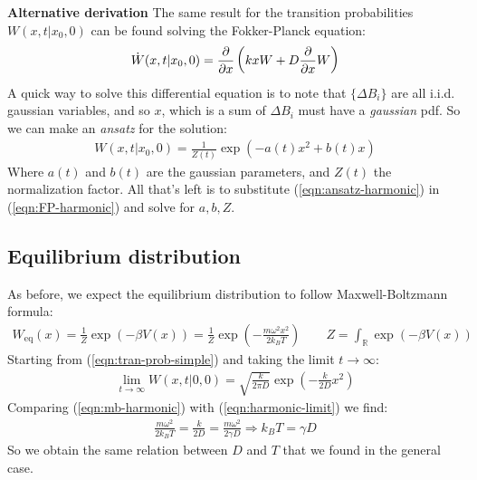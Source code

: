 \documentclass[../template.tex]{subfiles}
\begin{document}
\begin{expl}\textbf{Alternative derivation} 
    The same result for the transition probabilities $W(x,t|x_0,0)$ can be found solving the Fokker-Planck equation:
    \begin{align}
        \dot{W}(x,t|x_0,0) = \pdv{x} \left(kx W + D \pdv{x}W\right)
        \label{eqn:FP-harmonic}
    \end{align}
    A quick way to solve this differential equation is to note that $\{\Delta B_i\}$ are all i.i.d. gaussian variables, and so $x$, which is a sum of $\Delta B_i$ must have a \textit{gaussian} pdf. So we can make an \textit{ansatz} for the solution:
    \begin{align}\label{eqn:ansatz-harmonic}
        W(x,t|x_0,0) = \frac{1}{Z(t)} \exp\left({-a(t) x^2 + b(t)x}\right) 
    \end{align}  
    Where $a(t)$ and $b(t)$ are the gaussian parameters, and $Z(t)$ the normalization factor. All that's left is to substitute (\ref{eqn:ansatz-harmonic}) in (\ref{eqn:FP-harmonic}) and solve for $a,b,Z$.
\end{expl}

\subsection{Equilibrium distribution}
As before, we expect the equilibrium distribution to follow Maxwell-Boltzmann formula:
\begin{align}
    W_{\mathrm{eq} }(x) = \frac{1}{Z} \exp(-\beta V(x)) = \frac{1}{Z} \exp\left(-\frac{m \omega^2 x^2}{2 k_B T} \right) \qquad Z = \int_{\mathbb{R}} \exp(-\beta V(x))  \label{eqn:mb-harmonic}
\end{align}
Starting from (\ref{eqn:tran-prob-simple}) and taking the limit $t \to \infty$:
\begin{align}
    \lim_{t \to \infty} W(x,t|0,0) = \sqrt{\frac{k}{2 \pi D} }\exp\left(-\frac{k}{2D} x^2 \right) \label{eqn:harmonic-limit}
\end{align}
Comparing (\ref{eqn:mb-harmonic}) with (\ref{eqn:harmonic-limit}) we find:
\begin{align*}
    \frac{m \omega^2}{2 k_B T} = \frac{k}{2D} = \frac{m \omega^2}{2 \gamma D} \Rightarrow k_B T = \gamma D   
\end{align*}
So we obtain the same relation between $D$ and $T$ that we found in the general case.
\end{document}
